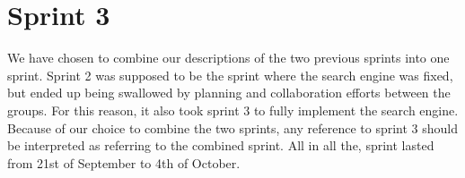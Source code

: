 \chapter{Sprint 3}
We have chosen to combine our descriptions of the two previous sprints into one sprint. Sprint 2 was supposed to be the sprint where the search engine was fixed, but ended up being swallowed by planning and collaboration efforts between the \knox{} groups. For this reason, it also took sprint 3 to fully implement the search engine. Because of our choice to combine the two sprints, any reference to sprint 3 should be interpreted as referring to the combined sprint.
All in all the, sprint lasted from 21st of September to 4th of October. 






